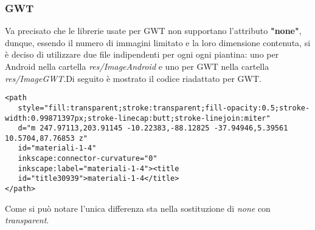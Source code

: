 \subsubsection*{GWT}
Va precisato che le librerie usate per GWT non supportano l'attributo \textbf{"none"}, dunque, essendo il numero di immagini limitato e la loro dimensione contenuta, si \`e deciso di utilizzare due file indipendenti per ogni ogni piantina: uno per Android nella cartella \textit{res/ImageAndroid} e uno per GWT nella cartella \textit{res/ImageGWT}.Di seguito \`e mostrato il codice riadattato per GWT.
\begin{lstlisting}
<path
   style="fill:transparent;stroke:transparent;fill-opacity:0.5;stroke-width:0.99871397px;stroke-linecap:butt;stroke-linejoin:miter"
   d="m 247.97113,203.91145 -10.22383,-88.12825 -37.94946,5.39561 10.5704,87.76853 z"
   id="materiali-1-4"
   inkscape:connector-curvature="0"
   inkscape:label="materiali-1-4"><title
   id="title30939">materiali-1-4</title>
</path> 
\end{lstlisting}
Come si pu\`o notare l'unica differenza sta nella sostituzione di \textit{none} con \textit{transparent}.

